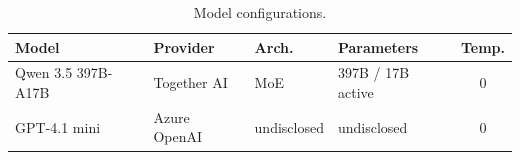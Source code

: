 


\begin{table}[htbp]
\centering
\caption{Model configurations.}
\label{tab:model-config}
\small
\begin{tabular}{@{}llllc@{}}
\toprule
Model & Provider & Arch. & Parameters & Temp. \\
\midrule
Qwen 3.5 397B-A17B & Together AI & MoE & 397B / 17B active & 0 \\
GPT-4.1 mini & Azure OpenAI & undisclosed & undisclosed & 0 \\
\bottomrule
\end{tabular}
\end{table}


